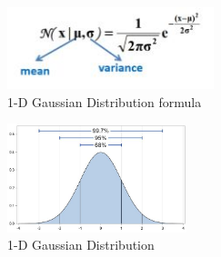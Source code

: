 \documentclass[12pt]{article}
\begin{document}
\begin{figure}[h]
    \centering
    \includegraphics[width=6cm]{formula}
    \caption{1-D Gaussian Distribution formula}
    \label{fig:1-D Gaussian Distribution formula}
\end{figure}
\begin{figure}[h]
    \centering
    \includegraphics[width=5.2cm]{guassian}
    \caption{1-D Gaussian Distribution}
    \label{fig:1-D Gaussian Distribution}
\end{figure}
\end{document}
